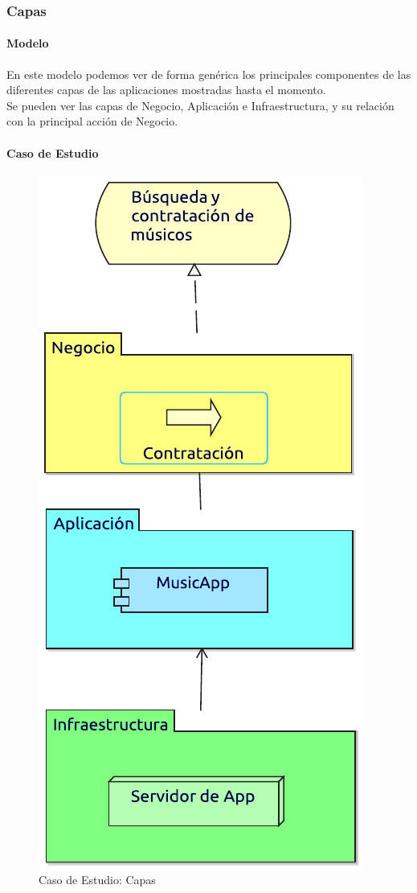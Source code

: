 \newpage

\subsubsection{Capas}
\paragraph{Modelo}
En este modelo podemos ver de forma genérica los principales componentes de las diferentes capas de las aplicaciones mostradas hasta el momento. \\

Se pueden ver las capas de Negocio, Aplicación e Infraestructura, y su relación con la principal acción de Negocio.
\paragraph{Caso de Estudio}

\begin{figure}[hbt!]
	\centering
	\includegraphics[width=0.4\linewidth]{Desarrollo/ArquitecturaEmpresarial/Tecnologia/imgs/capas.pdf}
	\caption{Caso de Estudio: Capas}
\end{figure}
